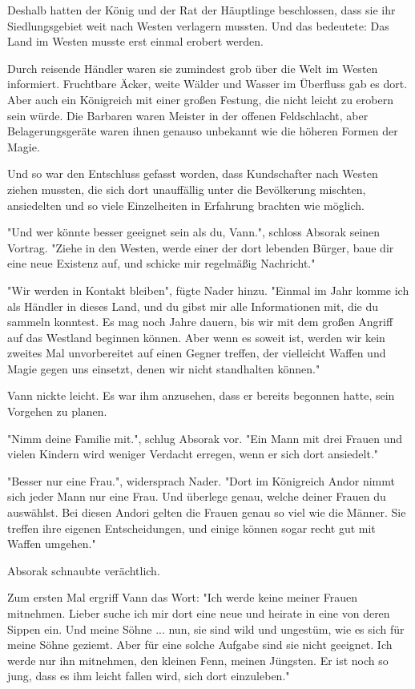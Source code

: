 \documentclass[10pt, a4paper, oneside]{book}
\begin{document}
\begin{multicols}{2}
Deshalb hatten der König und der Rat der Häuptlinge beschlossen, dass sie ihr Siedlungsgebiet weit nach Westen verlagern mussten. Und das bedeutete: Das Land im Westen musste erst einmal erobert werden.

Durch reisende Händler waren sie zumindest grob über die Welt im Westen informiert. Fruchtbare Äcker, weite Wälder und Wasser im Überfluss gab es dort. Aber auch ein Königreich mit einer großen Festung, die nicht leicht zu erobern sein würde. Die Barbaren waren Meister in der offenen Feldschlacht, aber Belagerungsgeräte waren ihnen genauso unbekannt wie die höheren Formen der Magie.

Und so war den Entschluss gefasst worden, dass Kundschafter nach Westen ziehen mussten, die sich dort unauffällig unter die Bevölkerung mischten, ansiedelten und so viele Einzelheiten in Erfahrung brachten wie möglich.

"Und wer könnte besser geeignet sein als du, Vann.", schloss Absorak seinen Vortrag. "Ziehe in den Westen, werde einer der dort lebenden Bürger, baue dir eine neue Existenz auf, und schicke mir regelmäßig Nachricht."

"Wir werden in Kontakt bleiben", fügte Nader hinzu. "Einmal im Jahr komme ich als Händler in dieses Land, und du gibst mir alle Informationen mit, die du sammeln konntest. Es mag noch Jahre dauern, bis wir mit dem großen Angriff auf das Westland beginnen können. Aber wenn es soweit ist, werden wir kein zweites Mal unvorbereitet auf einen Gegner treffen, der vielleicht Waffen und Magie gegen uns einsetzt, denen wir nicht standhalten können."

Vann nickte leicht. Es war ihm anzusehen, dass er bereits begonnen hatte, sein Vorgehen zu planen.

"Nimm deine Familie mit.", schlug Absorak vor. "Ein Mann mit drei Frauen und vielen Kindern wird weniger Verdacht erregen, wenn er sich dort ansiedelt."

"Besser nur eine Frau.", widersprach Nader. "Dort im Königreich Andor nimmt sich jeder Mann nur eine Frau. Und überlege genau, welche deiner Frauen du auswählst. Bei diesen Andori gelten die Frauen genau so viel wie die Männer. Sie treffen ihre eigenen Entscheidungen, und einige können sogar recht gut mit Waffen umgehen."

Absorak schnaubte verächtlich.

Zum ersten Mal ergriff Vann das Wort: "Ich werde keine meiner Frauen mitnehmen. Lieber suche ich mir dort eine neue und heirate in eine von deren Sippen ein. Und meine Söhne ... nun, sie sind wild und ungestüm, wie es sich für meine Söhne geziemt. Aber für eine solche Aufgabe sind sie nicht geeignet. Ich werde nur ihn mitnehmen, den kleinen Fenn, meinen Jüngsten. Er ist noch so jung, dass es ihm leicht fallen wird, sich dort einzuleben."


\end{multicols}
\end{document}
